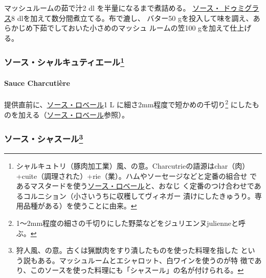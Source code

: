 \begin{recette}
マッシュルームの茹で汁2\undemi{} dl を半量になるまで煮詰める。
\protect\hyperlink{sauce-demi-glace}{ソース・ ドゥミグラス}8
dlを加えて数分間煮立てる。布で漉し、 バター50
gを投入して味を調え、あらかじめ下茹でしておいた小さめのマッシュ
ルームの笠100 gを加えて仕上げる。

\maeaki

\hypertarget{ux30bdux30fcux30b9ux30b7ux30e3ux30ebux30adux30e5ux30c6ux30a3ux30a8ux30fcux30eb8}{%
\subsubsection[ソース・シャルキュティエール]{\texorpdfstring{ソース・シャルキュティエール\footnote{シャルキュトリ（豚肉加工業）風、の意。Charcutrieの語源はchar（肉）
  +cuite（調理された）+rie（業）。ハムやソーセージなどと定番の組合せ
  であるマスタードを使う\protect\hyperlink{sauce-robert}{ソース・ロベール}と、おなじ
  く定番のつけ合わせであるコルニション（小さいうちに収穫してヴィネガー
  漬けにしたきゅうり。専用品種がある）を使うことに由来。}}{ソース・シャルキュティエール}}\label{ux30bdux30fcux30b9ux30b7ux30e3ux30ebux30adux30e5ux30c6ux30a3ux30a8ux30fcux30eb8}}

\hypertarget{sauce-charcutiere}{%
\paragraph{Sauce Charcutière}\label{sauce-charcutiere}}


提供直前に、\protect\hyperlink{sauce-robert}{ソース・ロベール}1 L
に細さ2mm程度で短かめの千切り\footnote{1〜2mm程度の細さの千切りにした野菜などをジュリエンヌjulienneと呼
  ぶ。}
にしたものを加える（\protect\hyperlink{sauce-robert}{ソース・ロベール}参照）。

\maeaki

\hypertarget{ux30bdux30fcux30b9ux30b7ux30e3ux30b9ux30fcux30eb10}{%
\subsubsection[ソース・シャスール]{\texorpdfstring{ソース・シャスール\footnote{狩人風、の意。古くは猟獣肉をすり潰したものを使った料理を指した
  という説もある。マッシュルームとエシャロット、白ワインを使うのが特
  徴であり、このソースを使った料理にも「シャスール」の名が付けられる。}}{ソース・シャスール}}\label{ux30bdux30fcux30b9ux30b7ux30e3ux30b9ux30fcux30eb10}}


\end{recette}
